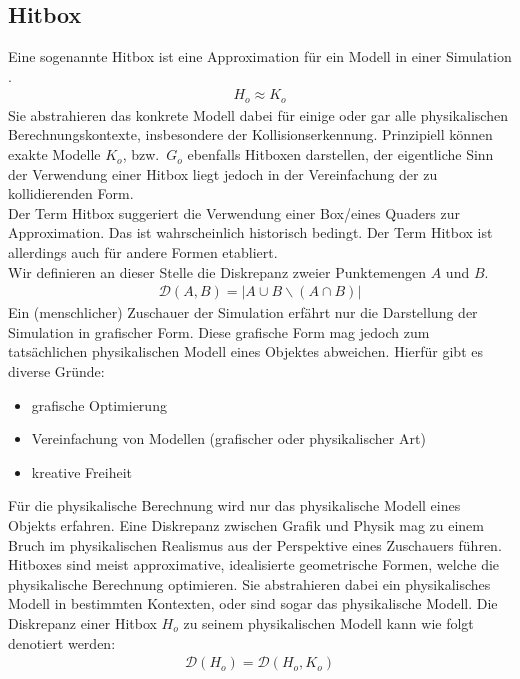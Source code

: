 \subsection{Hitbox}
\label{sec:hitbox}
Eine sogenannte Hitbox ist eine Approximation für ein Modell in einer Simulation \cite{hitbox}.
\begin{align}
H_o \approx K_o
\end{align}
 Sie abstrahieren das konkrete Modell dabei für einige oder gar alle physikalischen Berechnungskontexte, insbesondere der Kollisionserkennung. Prinzipiell können exakte Modelle $K_o$, bzw.~$G_o$ ebenfalls Hitboxen darstellen, der eigentliche Sinn der Verwendung einer Hitbox liegt jedoch in der Vereinfachung der zu kollidierenden Form.\\
Der Term Hitbox suggeriert die Verwendung einer Box/eines Quaders zur Approximation. Das ist wahrscheinlich historisch bedingt. Der Term Hitbox ist allerdings auch für andere Formen etabliert.\\
Wir definieren an dieser Stelle die Diskrepanz zweier Punktemengen $A$ und $B$.
\begin{align}
	\mathcal{D}(A, B) = | A \cup B \backslash (A \cap B) |
\end{align} 
Ein (menschlicher) Zuschauer der Simulation erfährt nur die Darstellung der Simulation in grafischer Form. Diese grafische Form mag jedoch zum tatsächlichen physikalischen Modell eines Objektes abweichen.
Hierfür gibt es diverse Gründe:
\begin{itemize}
\item grafische Optimierung
\item Vereinfachung von Modellen (grafischer oder physikalischer Art)
\item kreative Freiheit
\end{itemize}
Für die physikalische Berechnung wird nur das physikalische Modell eines Objekts erfahren. Eine Diskrepanz zwischen Grafik und Physik mag zu einem Bruch im physikalischen Realismus aus der Perspektive eines Zuschauers führen.
Hitboxes sind meist approximative, idealisierte geometrische Formen, welche die physikalische Berechnung optimieren. Sie abstrahieren dabei ein physikalisches Modell in bestimmten Kontexten, oder sind sogar das physikalische Modell. 
Die Diskrepanz einer Hitbox $H_o$ zu seinem physikalischen Modell kann wie folgt denotiert werden:
\begin{align}
\mathcal{D}(H_o) = \mathcal{D}(H_o, K_o)
\end{align}



